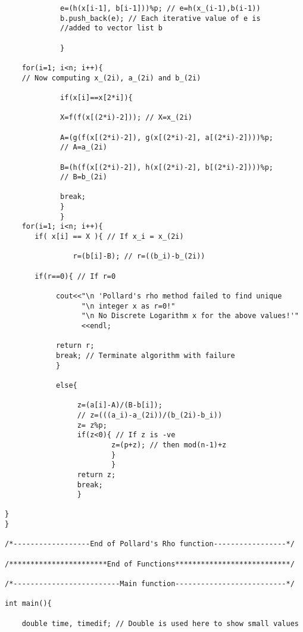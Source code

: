 \documentclass[iwp,first]{luthesis}
\begin{document}
\begin{verbatim}
             e=(h(x[i-1], b[i-1]))%p; // e=h(x_(i-1),b(i-1))
             b.push_back(e); // Each iterative value of e is 
             //added to vector list b

             }
             
    for(i=1; i<n; i++){
    // Now computing x_(2i), a_(2i) and b_(2i)
            
             if(x[i]==x[2*i]){
            
             X=f(f(x[(2*i)-2])); // X=x_(2i)
             
             A=(g(f(x[(2*i)-2]), g(x[(2*i)-2], a[(2*i)-2])))%p; 
             // A=a_(2i)
        
             B=(h(f(x[(2*i)-2]), h(x[(2*i)-2], b[(2*i)-2])))%p; 
             // B=b_(2i)
             
             break;
             }
             }
    for(i=1; i<n; i++){     
       if( x[i] == X ){ // If x_i = x_(2i)
                   
                r=(b[i]-B); // r=((b_i)-b_(2i))
                
       if(r==0){ // If r=0

            cout<<"\n 'Pollard's rho method failed to find unique 
                  "\n integer x as r=0!"
                  "\n No Discrete Logarithm x for the above values!'"
                  <<endl;

            return r;
            break; // Terminate algorithm with failure
            }

            else{
                  
                 z=(a[i]-A)/(B-b[i]); 
                 // z=(((a_i)-a_(2i))/(b_(2i)-b_i)) 
                 z= z%p;
                 if(z<0){ // If z is -ve
                         z=(p+z); // then mod(n-1)+z
                         }
                         }
                 return z;
                 break;
                 }
                 
}
}

/*------------------End of Pollard's Rho function-----------------*/

/***********************End of Functions***************************/

/*-------------------------Main function--------------------------*/

int main(){
    
    double time, timedif; // Double is used here to show small values


\end{verbatim}
\end{document}
